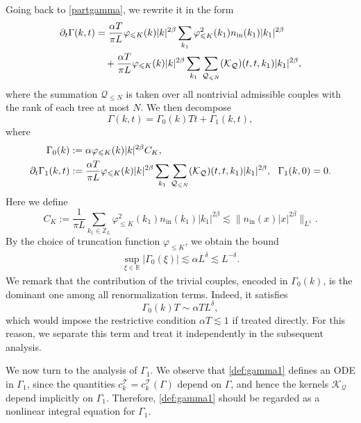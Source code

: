 \documentclass[UTF-8,reqno]{amsart}
\numberwithin{equation}{section}
\theoremstyle{definition}
\def\leq{\leqslant}
\def\leq{\leqslant}
\begin{document}
Going back to \eqref{partgamma}, we rewrite it in the form \begin{align}
    \partial_t\Gamma(k,t)&=\frac{\alpha T}{\pi L}\varphi_{\leq K}(k)|k|^{2\beta}\sum_{k_1}\varphi_{\leq K}^2(k_1)n_{\mathrm{in}}(k_1)|k_1|^{2\beta}\notag\\
    &\quad+\frac{\alpha T}{\pi L}\varphi_{\leq K}(k)|k|^{2\beta}\sum_{k_1}\sum_{\mathcal{Q}_{\leq N}}(\mathcal{K}_\mathcal{Q})(t,t,k_1)|k_1|^{2\beta},\notag
\end{align}
where the summation $\mathcal{Q}_{\leq N}$ is taken over all nontrivial admissible couples with the rank of each tree at most $N$.
We then decompose $$\Gamma(k,t)=\Gamma_0(k)Tt+\Gamma_1(k,t),$$ where 
 \begin{align}
     \Gamma_0(k)&:= \alpha  \varphi_{\leq K}(k)|k|^{2\beta}C_K,\notag\\
     \partial_t  \Gamma_1(k,t)&:=\frac{\alpha T}{\pi L}\varphi_{\leq K}(k)|k|^{2\beta}\sum_{k_1}\sum_{\mathcal{Q}_{\leq N}}(\mathcal{K}_\mathcal{Q})(t,t,k_1)|k_1|^{2\beta},\ \ \Gamma_1(k,0)=0.\label{def:gamma1}
 \end{align}
 Here  we define $$C_K:=\frac{1}{\pi L}\sum_{k_1\in\mathbb{Z}_L}\varphi_{\leq K}^2(k_1)n_{\mathrm{in}}(k_1)|k_1|^{2\beta}  \lesssim  \|n_{\mathrm{in}}(x)|x|^{2\beta}\|_{L^1}.$$
 By the choice of truncation function $\varphi_{\leq K}$, we obtain the bound
\begin{align*}
   \sup_{\xi\in\mathbb{R}} |\Gamma_0(\xi)|\lesssim  \alpha  L^\delta\lesssim L^{-\delta}.
\end{align*}
We remark that the contribution of the trivial couples, encoded in $\Gamma_0(k)$, is the dominant one among all renormalization terms. Indeed, it satisfies  
\[
\Gamma_0(k) T \sim \alpha TL^{\delta},
\]
which would impose the restrictive condition $\alpha T \lesssim 1$ if treated directly.
For this reason, we separate this term and treat it independently in the subsequent analysis.  

We now turn to the analysis of $\Gamma_1$. We observe that \eqref{def:gamma1} defines an ODE in $\Gamma_1$, since   the quantities $c_k^{\mathcal{T}} = c_k^{\mathcal{T}}(\Gamma)$ depend on $\Gamma$, and hence the kernels $\mathcal{K}_{\mathcal{Q}}$ depend implicitly on $\Gamma_1$. Therefore, \eqref{def:gamma1} should be regarded as a nonlinear integral equation for $\Gamma_1$.
 
\end{document}

